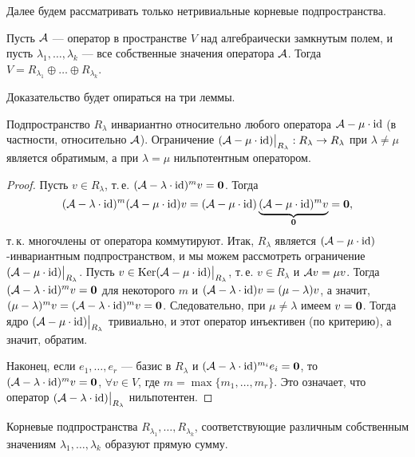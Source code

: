 Далее будем рассматривать только нетривиальные корневые подпространства.

\begin{theorem}
    Пусть $\mathcal{A}$ --- оператор в пространстве $V$ над алгебраически замкнутым полем, и пусть $\lambda_1, \ldots, \lambda_k$ --- все собственные значения оператора $\mathcal{A}$. Тогда $V = R_{\lambda_1} \oplus \ldots \oplus R_{\lambda_k}$.
\end{theorem}

Доказательство будет опираться на три леммы.

\begin{lemma}
    Подпространство $R_\lambda$ инвариантно относительно любого оператора $\mathcal{A} - \mu \cdot \mathrm{id}$ (в частности, относительно $\mathcal{A}$). Ограничение $(\mathcal{A} - \mu \cdot \mathrm{id})\big|_{R_\lambda}: R_\lambda \to R_\lambda$ при $\lambda \ne \mu$ является обратимым, а при $\lambda = \mu$ нильпотентным оператором.
\end{lemma}

\begin{proof}
    Пусть $v \in R_\lambda$, т.\,е. $(\mathcal{A} - \lambda \cdot \mathrm{id})^mv = \boldsymbol{0}$. Тогда
    \[
        (\mathcal{A} - \lambda \cdot \mathrm{id})^m(\mathcal{A} - \mu \cdot \mathrm{id})v = (\mathcal{A} - \mu \cdot \mathrm{id})\underbrace{(\mathcal{A} - \mu \cdot \mathrm{id})^mv}_{\boldsymbol{0}} = \boldsymbol{0},
    \]
    т.\,к. многочлены от оператора коммутируют. Итак, $R_\lambda$ является $(\mathcal{A} - \mu \cdot \mathrm{id})$-инвариантным подпространством, и мы можем рассмотреть ограничение $(\mathcal{A} - \mu \cdot \mathrm{id})\big|_{R_\lambda}$. Пусть $v \in \operatorname{Ker}(\mathcal{A} - \mu \cdot \mathrm{id})\big|_{R_\lambda}$, т.\,е. $v \in R_\lambda$ и $\mathcal{A} v = \mu v$. Тогда $(\mathcal{A} - \lambda \cdot \mathrm{id})^mv = \boldsymbol{0}$ для некоторого $m$ и $(\mathcal{A} - \lambda \cdot \mathrm{id})v = (\mu - \lambda)v$, а значит, $(\mu - \lambda)^mv = (\mathcal{A} - \lambda \cdot \mathrm{id})^mv = \boldsymbol{0}$. Следовательно, при $\mu \ne \lambda$ имеем $v = \boldsymbol{0}$. Тогда ядро $(\mathcal{A} - \mu \cdot \mathrm{id})\big|_{R_\lambda}$ тривиально, и этот оператор инъективен (по критерию), а значит, обратим.

    Наконец, если $e_1, \ldots, e_r$ --- базис в $R_\lambda$ и $(\mathcal{A} - \lambda \cdot \mathrm{id})^{m_i}e_i = \boldsymbol{0}$, то $(\mathcal{A} - \lambda \cdot \mathrm{id})^mv = \boldsymbol{0}$, $\forall v \in V$, где $m = \max\{m_1, \ldots, m_r\}$. Это означает, что оператор $(\mathcal{A} - \lambda \cdot \mathrm{id})\big|_{R_\lambda}$ нильпотентен.
\end{proof}

\begin{lemma}
    Корневые подпространства $R_{\lambda_1}, \ldots, R_{\lambda_k}$, соответствующие различным собственным значениям $\lambda_1, \ldots, \lambda_k$ образуют прямую сумму.
\end{lemma}

